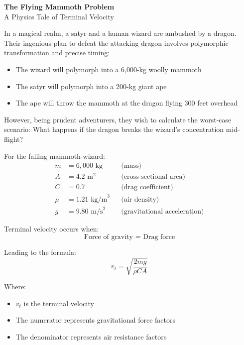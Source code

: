 \documentclass[12pt]{article}
\begin{document}
\begin{center}
\begin{tcolorbox}[colback=titlecolor!10,colframe=titlecolor,width=\textwidth]
\begin{center}
\huge\textbf{The Flying Mammoth Problem} \\[0.3cm]
\large A Physics Tale of Terminal Velocity
\end{center}
\end{tcolorbox}
\end{center}

\begin{tcolorbox}[colback=boxcolor!40,colframe=boxcolor!60,title=\textbf{Scenario}]
In a magical realm, a satyr and a human wizard are ambushed by a dragon. Their ingenious plan to defeat the attacking dragon involves polymorphic transformation and precise timing:

\begin{itemize}
    \item The wizard will polymorph into a 6,000-kg woolly mammoth
    \item The satyr will polymorph into a 200-kg giant ape
    \item The ape will throw the mammoth at the dragon flying 300 feet overhead
\end{itemize}

However, being prudent adventurers, they wish to calculate the worst-case scenario: What happens if the dragon breaks the wizard's concentration mid-flight?
\end{tcolorbox}

\begin{tcolorbox}[colback=boxcolor!40,colframe=boxcolor!60,title=\textbf{Given Parameters}]
For the falling mammoth-wizard:
\begin{align*}
    m &= 6,000 \text{ kg} &&\text{(mass)} \\
    A &= 4.2 \text{ m}^2 &&\text{(cross-sectional area)} \\
    C &= 0.7 &&\text{(drag coefficient)} \\
    \rho &= 1.21 \text{ kg/m}^3 &&\text{(air density)} \\
    g &= 9.80 \text{ m/s}^2 &&\text{(gravitational acceleration)}
\end{align*}
\end{tcolorbox}

\begin{tcolorbox}[colback=boxcolor!40,colframe=boxcolor!60,title=\textbf{Physical Analysis}]
Terminal velocity occurs when:
\[ \text{Force of gravity } = \text{ Drag force} \]

Leading to the formula:
\[ v_t = \sqrt{\frac{2mg}{\rho CA}} \]

Where:
\begin{itemize}
    \item $v_t$ is the terminal velocity
    \item The numerator represents gravitational force factors
    \item The denominator represents air resistance factors
\end{itemize}
\end{tcolorbox}
\end{document}
